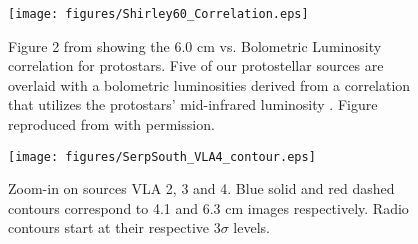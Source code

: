 \documentclass[apj]{emulateapj}
\begin{document}
\begin{figure}
\label{fig:shirley60_corr}
\centering
\texttt{[image: figures/Shirley60\_Correlation.eps]}
\caption{\small{Figure 2 from \citet{Shirley07} showing the 6.0 cm vs. Bolometric Luminosity correlation for protostars. Five of our protostellar sources are overlaid with a bolometric luminosities derived from a correlation that utilizes the protostars' mid-infrared luminosity \citep{Kryukova12}. Figure reproduced from \citet{Shirley07} with permission.
}}
\end{figure}

\begin{figure}
\label{fig:vla4}
\centering
\texttt{[image: figures/SerpSouth\_VLA4\_contour.eps]}
\caption{\small{ Zoom-in on sources VLA 2, 3 and 4. Blue solid and red dashed contours correspond to 4.1 and 6.3 cm images respectively. Radio contours start at their respective 3$\sigma$ levels.
}}
\end{figure}



\end{document}
